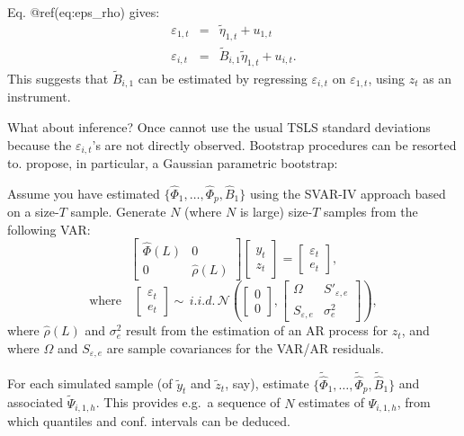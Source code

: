\documentclass[
  12pt,
]{book}
\theoremstyle{definition}
\theoremstyle{definition}
\theoremstyle{definition}
\theoremstyle{definition}
\theoremstyle{remark}
\begin{document}
Eq. @ref(eq:eps\_rho) gives:
\begin{eqnarray*}
\varepsilon_{1,t} &=& \tilde\eta_{1,t} + u_{1,t}\\
\varepsilon_{i,t} &=& \tilde{B}_{i,1} \tilde\eta_{1,t} + u_{i,t}.
\end{eqnarray*}
This suggests that \(\tilde{B}_{i,1}\) can be estimated by regressing \(\varepsilon_{i,t}\) on \(\varepsilon_{1,t}\), using \(z_t\) as an instrument.

What about inference? Once cannot use the usual TSLS standard deviations because the \(\varepsilon_{i,t}\)'s are not directly observed. Bootstrap procedures can be resorted to. \citet{Stock_Watson_2018} propose, in particular, a Gaussian parametric bootstrap:

Assume you have estimated \(\{\widehat{\Phi}_1,\dots,\widehat{\Phi}_p,\widehat{B}_1\}\) using the SVAR-IV approach based on a size-\(T\) sample. Generate \(N\) (where \(N\) is large) size-\(T\) samples from the following VAR:
\[
\left[
\begin{array}{cc}
\widehat{\Phi}(L) & 0 \\
0 & \widehat{\rho}(L)
\end{array}
\right]
\left[
\begin{array}{c}
y_t \\
z_t
\end{array}
\right] =
\left[
\begin{array}{c}
\varepsilon_t \\
e_t
\end{array}
\right],
\]
\[
\mbox{where} \quad \left[
\begin{array}{c}
\varepsilon_t \\
e_t
\end{array}
\right]\sim \, i.i.d.\,\mathcal{N}\left(\left[\begin{array}{c}0\\0\end{array}\right],
\left[\begin{array}{cc}
\Omega & S'_{\varepsilon,e}\\
S_{\varepsilon,e}& \sigma^2_{e}
\end{array}\right]
\right),
\]
where \(\widehat{\rho}(L)\) and \(\sigma^2_{e}\) result from the estimation of an AR process for \(z_t\), and where \(\Omega\) and \(S_{\varepsilon,e}\) are sample covariances for the VAR/AR residuals.

For each simulated sample (of \(\tilde{y}_t\) and \(\tilde{z}_t\), say), estimate \(\{\widetilde{\widehat{\Phi}}_1,\dots,\widetilde{\widehat{\Phi}}_p,\widetilde{\widehat{B}}_1\}\) and associated \(\widetilde{\Psi}_{i,1,h}\). This provides e.g.~a sequence of \(N\) estimates of \(\Psi_{i,1,h}\), from which quantiles and conf. intervals can be deduced.
\end{document}
